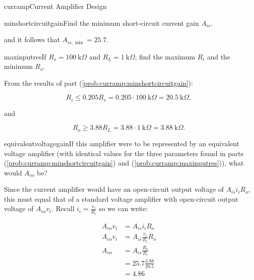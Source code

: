 \begin{mainquestion}{curramp}{Current Amplifier Design}
\begin{partquestion}{minshortcircuitgain}{Find the minimum short-circuit current gain $A_{is}$.}
\begin{answer}
and it follows that $A_{is,\min} = 25.7$.
\begin{kaitlyn}

\noindent{}

\end{kaitlyn}
\end{answer}
\end{partquestion}

\begin{partquestion}{maxinputres}{If $R_{s} = 100\ \text{k}\Omega$ and $R_{L} = 1\ \text{k}\Omega$, find the maximum $R_{i}$ and the minimum $R_{o}$.}
\begin{answer}
From the results of part (\cref{prob:curramp:minshortcircuitgain}):

\[
R_{i} \leq 0.205 R_{s} = 0.205 \cdot 100\ \text{k}\Omega = 20.5\ \text{k}\Omega,
\]

and

\[
R_{o} \geq 3.88 R_{L} = 3.88 \cdot 1\ \text{k}\Omega = 3.88\ \text{k}\Omega.
\]
\end{answer}
\end{partquestion}

\begin{partquestion}{equivalentvoltagegain}{If this amplifier were to be represented by an equivalent voltage amplifier (with identical values for the three parameters found in parts (\cref{prob:curramp:minshortcircuitgain}) and (\cref{prob:curramp:maxinputres})), what would $A_{vo}$ be?}
\begin{answer}
Since the current amplifier would have an open-circuit output voltage of $A_{is} i_{i} R_{o}$, this must equal that of a standard voltage amplifier with open-circuit output voltage of $A_{vo} v_{i}$. Recall $i_{i} = \frac{v_{i}}{R_{i}}$ so we can write:

\begin{align*}
    A_{vo} v_i &= A_{is} i_{i} R_o \\
    A_{vo} v_i &= A_{is} \frac{v_i}{R_i} R_o \\
    A_{vo} &= A_{is} \frac{R_o}{R_i} \\
    &= 25.7 \frac{3.88}{20.5} \\
    &= 4.86
\end{align*}
\begin{kaitlyn}


\end{kaitlyn}
\end{answer}
\end{partquestion}
\end{mainquestion}
